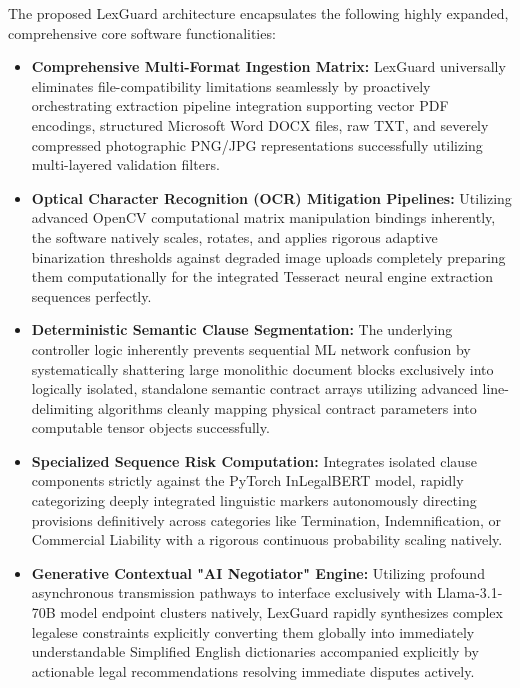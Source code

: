 \documentclass[a4paper,12pt]{report}
\begin{document}
The proposed LexGuard architecture encapsulates the following highly expanded, comprehensive core software functionalities:

\begin{itemize}
    \item \textbf{Comprehensive Multi-Format Ingestion Matrix:} LexGuard universally eliminates file-compatibility limitations seamlessly by proactively orchestrating extraction pipeline integration supporting vector PDF encodings, structured Microsoft Word DOCX files, raw TXT, and severely compressed photographic PNG/JPG representations successfully utilizing multi-layered validation filters.
    
    \item \textbf{Optical Character Recognition (OCR) Mitigation Pipelines:} Utilizing advanced OpenCV computational matrix manipulation bindings inherently, the software natively scales, rotates, and applies rigorous adaptive binarization thresholds against degraded image uploads completely preparing them computationally for the integrated Tesseract neural engine extraction sequences perfectly.
    
    \item \textbf{Deterministic Semantic Clause Segmentation:} The underlying controller logic inherently prevents sequential ML network confusion by systematically shattering large monolithic document blocks exclusively into logically isolated, standalone semantic contract arrays utilizing advanced line-delimiting algorithms cleanly mapping physical contract parameters into computable tensor objects successfully.
    
    \item \textbf{Specialized Sequence Risk Computation:} Integrates isolated clause components strictly against the PyTorch InLegalBERT model, rapidly categorizing deeply integrated linguistic markers autonomously directing provisions definitively across categories like Termination, Indemnification, or Commercial Liability with a rigorous continuous probability scaling natively.
    
    \item \textbf{Generative Contextual "AI Negotiator" Engine:} Utilizing profound asynchronous transmission pathways to interface exclusively with Llama-3.1-70B model endpoint clusters natively, LexGuard rapidly synthesizes complex legalese constraints explicitly converting them globally into immediately understandable Simplified English dictionaries accompanied explicitly by actionable legal recommendations resolving immediate disputes actively.
    

\end{itemize}
\end{document}
